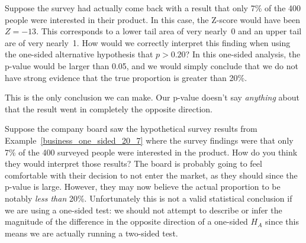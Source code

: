 %

\begin{example}{Suppose the survey had actually come back
    with a result that only 7\% of the 400 people were
    interested in their product. In this case, the Z-score
    would have been $Z = -13$. This corresponds to a lower
    tail area of very nearly~0 and an upper tail are of
    very nearly~1.
    How would we correctly interpret this finding when using
    the one-sided alternative hypothesis that $p > 0.20$?}
    \label{business_one_sided_20_7}
  In this one-sided analysis, the p-value would be larger
  than 0.05, and we would simply conclude that we do not
  have strong evidence that the true proportion is greater
  than 20\%.
  
  This is the only conclusion we can make. Our p-value
  doesn't say \emph{anything} about that the result went
  in completely the opposite direction.
\end{example}

\begin{example}{Suppose the company board saw the
    hypothetical survey results from
    Example~\ref{business_one_sided_20_7}
    where the survey findings were that only 7\% of
    the 400 surveyed people were interested in the product.
    How do you think they would interpret those results?}
    \label{business_one_sided_20_7-exec_interpretation}
  The board is probably going to feel comfortable with
  their decision to not enter the market, as they should
  since the p-value is large. However, they may now believe
  the actual proportion to be notably \emph{less than}
  20\%. Unfortunately this is not a valid statistical
  conclusion if we are using a one-sided test: we should
  not attempt to describe or infer the magnitude of the
  difference in the opposite direction of a one-sided
  $H_A$ since this means we are actually running a
  two-sided test.
\end{example}

